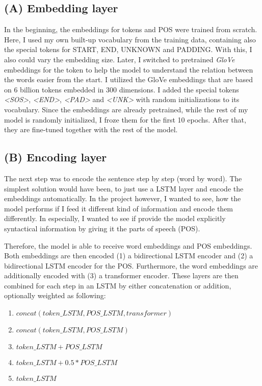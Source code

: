 \documentclass[
	11pt, %
]{fphw}
\begin{document}
\subsection*{(A) Embedding layer}
In the beginning, the embeddings for tokens and POS were trained from scratch. Here, I used my own built-up vocabulary from the training data, containing also the special tokens for START, END, UNKNOWN and PADDING. With this, I also could vary the embedding size. Later, I switched to pretrained \emph{GloVe} embeddings for the token to help the model to understand the relation between the words easier from the start. I utilized the GloVe embeddings that are based on 6 billion tokens embedded in 300 dimensions. I added the special tokens \emph{<SOS>}, \emph{<END>}, \emph{<PAD>} and \emph{<UNK>} with random initializations to its vocabulary. Since the embeddings are already pretrained, while the rest of my model is randomly initialized, I froze them for the first 10 epochs. After that, they are fine-tuned together with the rest of the model.

\subsection*{(B) Encoding layer}
The next step was to encode the sentence step by step (word by word). The simplest solution would have been, to just use a LSTM layer and encode the embeddings automatically. In the project however, I wanted to see, how the model performs if I feed it different kind of information and encode them differently. In especially, I wanted to see if provide the model explicitly syntactical information by giving it the parts of speech (POS).

Therefore, the model is able to receive word embeddings and POS embeddings. Both embeddings are then encoded (1) a bidirectional LSTM encoder and (2) a bidirectional LSTM encoder for the POS. Furthermore, the word embeddings are additionally encoded with (3) a transformer encoder. These layers are then combined for each step in an LSTM by either concatenation or addition, optionally weighted as following:
\begin{enumerate}
    \item $concat(token\_LSTM, POS\_LSTM, transformer)$
    \item $concat(token\_LSTM, POS\_LSTM)$
    \item $token\_LSTM + POS\_LSTM$
    \item $token\_LSTM + 0.5 * POS\_LSTM$
    \item $token\_LSTM$
\end{enumerate}
\end{document}
